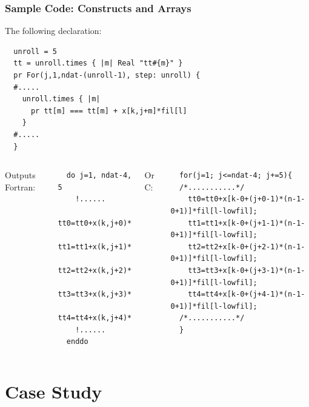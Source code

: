 \documentclass{beamer}
\begin{document}
\begin{frame}[fragile]
\frametitle{Sample Code: Constructs and Arrays}
The following declaration:
\tiny
\lstset{style=BOAST}
\begin{lstlisting}
  unroll = 5
  tt = unroll.times { |m| Real "tt#{m}" }
  pr For(j,1,ndat-(unroll-1), step: unroll) {
  #.....
    unroll.times { |m|
      pr tt[m] === tt[m] + x[k,j+m]*fil[l]
    }
  #.....
  }
\end{lstlisting}
\begin{columns}
\normalsize 
Outputs Fortran:
\tiny
\lstset{style=BFortran}
\begin{lstlisting}
  do j=1, ndat-4, 5
    !......
    tt0=tt0+x(k,j+0)*fil(l)
    tt1=tt1+x(k,j+1)*fil(l)
    tt2=tt2+x(k,j+2)*fil(l)
    tt3=tt3+x(k,j+3)*fil(l)
    tt4=tt4+x(k,j+4)*fil(l)
    !......
  enddo
\end{lstlisting}
\normalsize
Or C:
\tiny
\lstset{style=BC}
\begin{lstlisting}
  for(j=1; j<=ndat-4; j+=5){
  /*...........*/
    tt0=tt0+x[k-0+(j+0-1)*(n-1-0+1)]*fil[l-lowfil];
    tt1=tt1+x[k-0+(j+1-1)*(n-1-0+1)]*fil[l-lowfil];
    tt2=tt2+x[k-0+(j+2-1)*(n-1-0+1)]*fil[l-lowfil];
    tt3=tt3+x[k-0+(j+3-1)*(n-1-0+1)]*fil[l-lowfil];
    tt4=tt4+x[k-0+(j+4-1)*(n-1-0+1)]*fil[l-lowfil];
  /*...........*/
  }
\end{lstlisting}
\end{columns}
\end{frame}


\section{Case Study}
\end{document}
